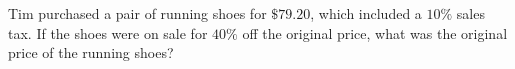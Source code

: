 Tim purchased a pair of running shoes for $\$79.20$, which included a $10\%$ sales tax. If the shoes were on sale for $40\%$ off the original price, what was the original price of the running shoes?
